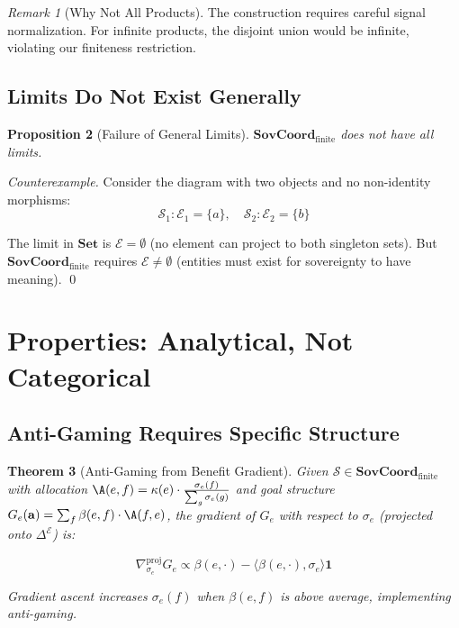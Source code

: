 \documentclass[11pt,a4paper]{article}
\newtheorem{theorem}{Theorem}[section]
\newtheorem{proposition}[theorem]{Proposition}
\theoremstyle{definition}
\theoremstyle{remark}
\newtheorem{remark}[theorem]{Remark}
\newcommand{\E}{\mathcal{E}}
\newcommand{\SovCoord}{\mathbf{SovCoord}}
\begin{document}
\begin{remark}[Why Not All Products]
The construction requires careful signal normalization. For infinite products, the disjoint union would be infinite, violating our finiteness restriction.
\end{remark}

\subsection{Limits Do Not Exist Generally}

\begin{proposition}[Failure of General Limits]
\label{prop:no-limits}
$\SovCoord_{\text{finite}}$ does not have all limits.
\end{proposition}

\begin{proof}[Counterexample]
Consider the diagram with two objects and no non-identity morphisms:
\[ \mathcal{S}_1: \E_1 = \{a\}, \quad \mathcal{S}_2: \E_2 = \{b\} \]

The limit in $\mathbf{Set}$ is $\E = \emptyset$ (no element can project to both singleton sets). But $\SovCoord_{\text{finite}}$ requires $\E \neq \emptyset$ (entities must exist for sovereignty to have meaning). \qed
\end{proof}

\section{Properties: Analytical, Not Categorical}

\subsection{Anti-Gaming Requires Specific Structure}

\begin{theorem}[Anti-Gaming from Benefit Gradient]
\label{thm:anti-gaming}
Given $\mathcal{S} \in \SovCoord_{\text{finite}}$ with allocation $\A(e,f) = \kappa(e) \cdot \frac{\sigma_e(f)}{\sum_g \sigma_e(g)}$ and goal structure $G_e(\mathbf{a}) = \sum_f \beta(e,f) \cdot \A(f,e)$, the gradient of $G_e$ with respect to $\sigma_e$ (projected onto $\Delta^{\E}$) is:

\[ \nabla_{\sigma_e}^{\text{proj}} G_e \propto \beta(e,\cdot) - \langle \beta(e,\cdot), \sigma_e \rangle \mathbf{1} \]

Gradient ascent increases $\sigma_e(f)$ when $\beta(e,f)$ is above average, implementing anti-gaming.
\end{theorem}
\end{document}
